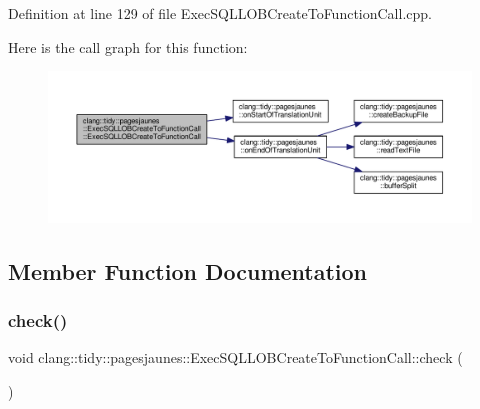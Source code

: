 Definition at line 129 of file Exec\+S\+Q\+L\+L\+O\+B\+Create\+To\+Function\+Call.\+cpp.

Here is the call graph for this function\+:
\nopagebreak
\begin{figure}[H]
\begin{center}
\leavevmode
\includegraphics[width=350pt]{classclang_1_1tidy_1_1pagesjaunes_1_1_exec_s_q_l_l_o_b_create_to_function_call_afe023bb4af1693a28a9de7978b9f9ccd_cgraph}
\end{center}
\end{figure}


\subsection{Member Function Documentation}
\mbox{\label{classclang_1_1tidy_1_1pagesjaunes_1_1_exec_s_q_l_l_o_b_create_to_function_call_a467bfebda1820296365c19c263ccea21}} 
\subsubsection{\texorpdfstring{check()}{check()}}
{\footnotesize\ttfamily void clang\+::tidy\+::pagesjaunes\+::\+Exec\+S\+Q\+L\+L\+O\+B\+Create\+To\+Function\+Call\+::check (\begin{DoxyParamCaption}\item[{const ast\+\_\+matchers\+::\+Match\+Finder\+::\+Match\+Result \&}]{ }\end{DoxyParamCaption})\hspace{0.3cm}{\ttfamily [override]}}



